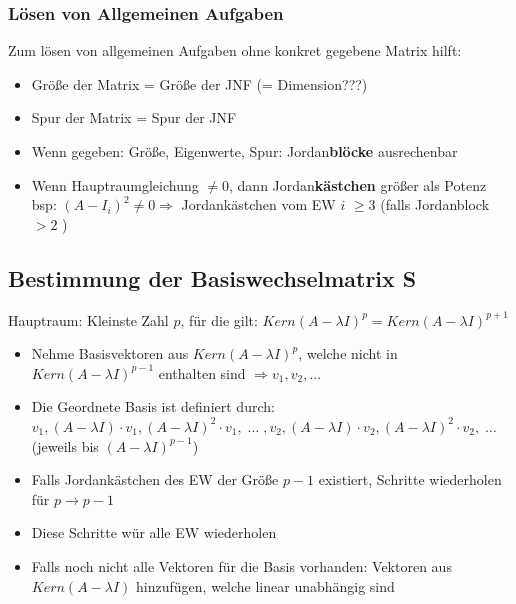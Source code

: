 \documentclass[a4paper,portrait]{scrartcl}
\begin{document}
\subsubsection*{Lösen von Allgemeinen Aufgaben}
Zum lösen von allgemeinen Aufgaben ohne konkret gegebene Matrix hilft:
\begin{itemize}
	\item Größe der Matrix = Größe der JNF (= Dimension???)
	\item Spur der Matrix = Spur der JNF
	\item Wenn gegeben: Größe, Eigenwerte, Spur: Jordan\textbf{blöcke} ausrechenbar
	\item Wenn Hauptraumgleichung $\neq 0$, dann Jordan\textbf{kästchen} größer als Potenz\\
		bsp: $(A-I_i)^2 \neq 0 \Rightarrow$ Jordankästchen vom EW $i$  $\geq 3$ (falls Jordanblock $>2$ )
\end{itemize}
\subsection{Bestimmung der Basiswechselmatrix S}
Hauptraum: Kleinste Zahl $p$, für die gilt: $Kern(A-\lambda I)^p = Kern(A-\lambda I)^{p+1}$\\
\begin{itemize}
	\item Nehme Basisvektoren aus $Kern(A-\lambda I)^p$, welche nicht in  $Kern(A-\lambda I)^{p-1}$ enthalten sind $\Rightarrow v_1, v_2, ...$
	\item Die Geordnete Basis ist definiert durch: \\
		$v_1, (A-\lambda I)\cdot v_1, (A-\lambda I)^2\cdot v_1,\; \hdots\; , v_2, (A-\lambda I)\cdot v_2, (A-\lambda I)^2\cdot v_2,\; \hdots$\\
		(jeweils bis $(A-\lambda I)^{p-1}$)
	\item Falls Jordankästchen des EW der Größe $p-1$ existiert, Schritte wiederholen für $p \rightarrow p-1$
	\item Diese Schritte wür alle EW wiederholen
	\item Falls noch nicht alle Vektoren für die Basis vorhanden: Vektoren aus $Kern(A-\lambda I)$ hinzufügen, welche linear unabhängig sind
	
\end{itemize}
\end{document}
